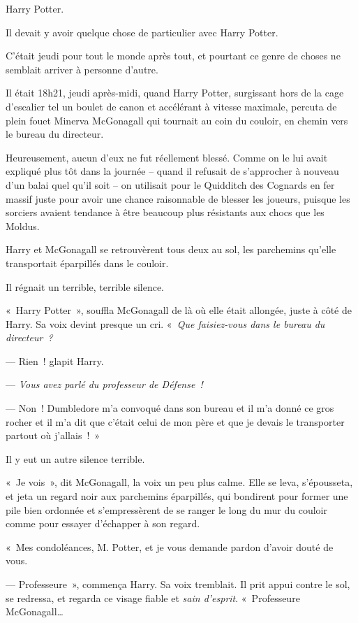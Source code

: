 \later

Harry Potter.

Il devait y avoir quelque chose de particulier avec Harry Potter.

C'était jeudi pour tout le monde après tout, et pourtant ce genre de choses ne semblait arriver à personne d'autre.

Il était 18h21, jeudi après-midi, quand Harry Potter, surgissant hors de la cage d'escalier tel un boulet de canon et accélérant à vitesse maximale, percuta de plein fouet Minerva McGonagall qui tournait au coin du couloir, en chemin vers le bureau du directeur.

Heureusement, aucun d'eux ne fut réellement blessé.
Comme on le lui avait expliqué plus tôt dans la journée -- quand il refusait de s'approcher à nouveau d'un balai quel qu'il soit -- on utilisait pour le Quidditch des Cognards en fer massif juste pour avoir une chance raisonnable de blesser les joueurs, puisque les sorciers avaient tendance à être beaucoup plus résistants aux chocs que les Moldus.

Harry et McGonagall se retrouvèrent tous deux au sol, les parchemins qu'elle transportait éparpillés dans le couloir.

Il régnait un terrible, terrible silence.

«~Harry Potter~», souffla McGonagall de là où elle était allongée, juste à côté de Harry.
Sa voix devint presque un cri.
«~\emph{Que faisiez-vous dans le bureau du directeur~?}

--- Rien~! glapit Harry.

--- \emph{Vous avez parlé du professeur de Défense~!}

--- Non~!
Dumbledore m'a convoqué dans son bureau et il m'a donné ce gros rocher et il m'a dit que c'était celui de mon père et que je devais le transporter partout où j'allais~!~»

Il y eut un autre silence terrible.

«~Je vois~», dit McGonagall, la voix un peu plus calme.
Elle se leva, s'épousseta, et jeta un regard noir aux parchemins éparpillés, qui bondirent pour former une pile bien ordonnée et s'empressèrent de se ranger le long du mur du couloir comme pour essayer d'échapper à son regard.

«~Mes condoléances, M. Potter, et je vous demande pardon d'avoir douté de vous.

--- Professeure~», commença Harry.
Sa voix tremblait.
Il prit appui contre le sol, se redressa, et regarda ce visage fiable et \emph{sain d'esprit}.
«~Professeure McGonagall…

